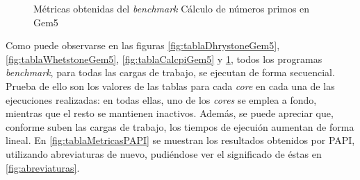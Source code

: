 \begin{figure}[H]
    \centering
    \caption{Métricas obtenidas del \textit{benchmark} Cálculo de números primos en Gem5}
    \label{fig:tablaCalcprimosGem5}
\end{figure}

Como puede observarse en las figuras \ref{fig:tablaDhrystoneGem5}, \ref{fig:tablaWhetstoneGem5}, \ref{fig:tablaCalcpiGem5} y \ref{fig:tablaCalcprimosGem5}, todos los programas \textit{benchmark}, para todas las cargas de trabajo, se ejecutan de forma secuencial. Prueba de ello son los valores de las tablas para cada \textit{core} en cada una de las ejecuciones realizadas: en todas ellas, uno de los \textit{cores} se emplea a fondo, mientras que el resto se mantienen inactivos. Además, se puede apreciar que, conforme suben las cargas de trabajo, los tiempos de ejecuión aumentan de forma lineal. En \ref{fig:tablaMetricasPAPI} se muestran los resultados obtenidos por PAPI, utilizando abreviaturas de nuevo, pudiéndose ver el significado de éstas en \ref{fig:abreviaturas}.

